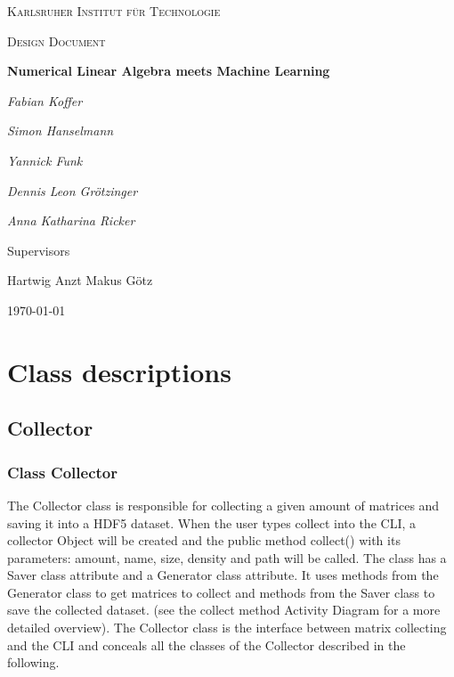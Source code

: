 \documentclass[parskip=full]{scrartcl}
\begin{document}
\begin{titlepage}
\centering
{\scshape\LARGE Karlsruher Institut für Technologie\par}
\vspace{1cm}
{\scshape\Large Design Document\par}
\vspace{1.5cm}
{\huge\bfseries Numerical Linear Algebra meets Machine Learning \par}
\vspace {2cm}

{\Large\itshape Fabian Koffer\par}
{\Large\itshape Simon Hanselmann\par}
{\Large\itshape Yannick Funk\par}
{\Large\itshape Dennis Leon Gr\"{o}tzinger\par}
{\Large\itshape Anna Katharina Ricker\par}

\vfill
Supervisors\par
Hartwig Anzt
Makus G\"{o}tz

\vfill
{\large\today\par}
\end{titlepage}

\tableofcontents
\newpage


\section{Class descriptions}

\subsection{Collector}
\subsubsection{Class Collector}
The Collector class is responsible for collecting a given amount of matrices and saving it into a HDF5 dataset.
When the user types collect into the CLI, a collector Object will be created and the public method collect() with its parameters:
amount, name, size, density and path will be called. The class has a Saver class attribute and a Generator class attribute. It uses methods from the Generator class to get matrices to collect and methods from the Saver class to save the collected dataset.
(see the collect method Activity Diagram for a more detailed overview).
The Collector class is the interface between matrix collecting and the CLI and conceals all the classes of the Collector described in the following.
\end{document}
